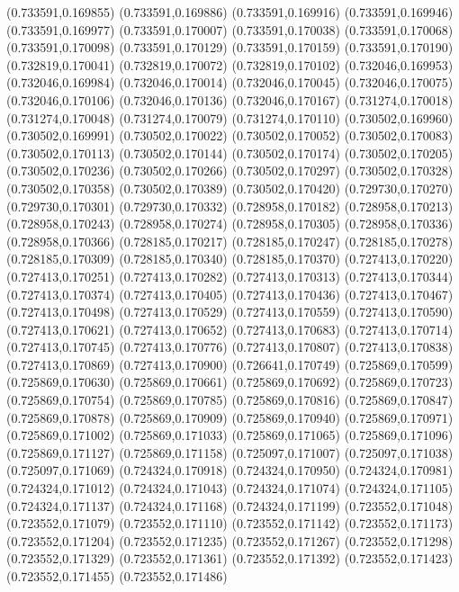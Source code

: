 (0.733591,0.169855)
(0.733591,0.169886)
(0.733591,0.169916)
(0.733591,0.169946)
(0.733591,0.169977)
(0.733591,0.170007)
(0.733591,0.170038)
(0.733591,0.170068)
(0.733591,0.170098)
(0.733591,0.170129)
(0.733591,0.170159)
(0.733591,0.170190)
(0.732819,0.170041)
(0.732819,0.170072)
(0.732819,0.170102)
(0.732046,0.169953)
(0.732046,0.169984)
(0.732046,0.170014)
(0.732046,0.170045)
(0.732046,0.170075)
(0.732046,0.170106)
(0.732046,0.170136)
(0.732046,0.170167)
(0.731274,0.170018)
(0.731274,0.170048)
(0.731274,0.170079)
(0.731274,0.170110)
(0.730502,0.169960)
(0.730502,0.169991)
(0.730502,0.170022)
(0.730502,0.170052)
(0.730502,0.170083)
(0.730502,0.170113)
(0.730502,0.170144)
(0.730502,0.170174)
(0.730502,0.170205)
(0.730502,0.170236)
(0.730502,0.170266)
(0.730502,0.170297)
(0.730502,0.170328)
(0.730502,0.170358)
(0.730502,0.170389)
(0.730502,0.170420)
(0.729730,0.170270)
(0.729730,0.170301)
(0.729730,0.170332)
(0.728958,0.170182)
(0.728958,0.170213)
(0.728958,0.170243)
(0.728958,0.170274)
(0.728958,0.170305)
(0.728958,0.170336)
(0.728958,0.170366)
(0.728185,0.170217)
(0.728185,0.170247)
(0.728185,0.170278)
(0.728185,0.170309)
(0.728185,0.170340)
(0.728185,0.170370)
(0.727413,0.170220)
(0.727413,0.170251)
(0.727413,0.170282)
(0.727413,0.170313)
(0.727413,0.170344)
(0.727413,0.170374)
(0.727413,0.170405)
(0.727413,0.170436)
(0.727413,0.170467)
(0.727413,0.170498)
(0.727413,0.170529)
(0.727413,0.170559)
(0.727413,0.170590)
(0.727413,0.170621)
(0.727413,0.170652)
(0.727413,0.170683)
(0.727413,0.170714)
(0.727413,0.170745)
(0.727413,0.170776)
(0.727413,0.170807)
(0.727413,0.170838)
(0.727413,0.170869)
(0.727413,0.170900)
(0.726641,0.170749)
(0.725869,0.170599)
(0.725869,0.170630)
(0.725869,0.170661)
(0.725869,0.170692)
(0.725869,0.170723)
(0.725869,0.170754)
(0.725869,0.170785)
(0.725869,0.170816)
(0.725869,0.170847)
(0.725869,0.170878)
(0.725869,0.170909)
(0.725869,0.170940)
(0.725869,0.170971)
(0.725869,0.171002)
(0.725869,0.171033)
(0.725869,0.171065)
(0.725869,0.171096)
(0.725869,0.171127)
(0.725869,0.171158)
(0.725097,0.171007)
(0.725097,0.171038)
(0.725097,0.171069)
(0.724324,0.170918)
(0.724324,0.170950)
(0.724324,0.170981)
(0.724324,0.171012)
(0.724324,0.171043)
(0.724324,0.171074)
(0.724324,0.171105)
(0.724324,0.171137)
(0.724324,0.171168)
(0.724324,0.171199)
(0.723552,0.171048)
(0.723552,0.171079)
(0.723552,0.171110)
(0.723552,0.171142)
(0.723552,0.171173)
(0.723552,0.171204)
(0.723552,0.171235)
(0.723552,0.171267)
(0.723552,0.171298)
(0.723552,0.171329)
(0.723552,0.171361)
(0.723552,0.171392)
(0.723552,0.171423)
(0.723552,0.171455)
(0.723552,0.171486)
